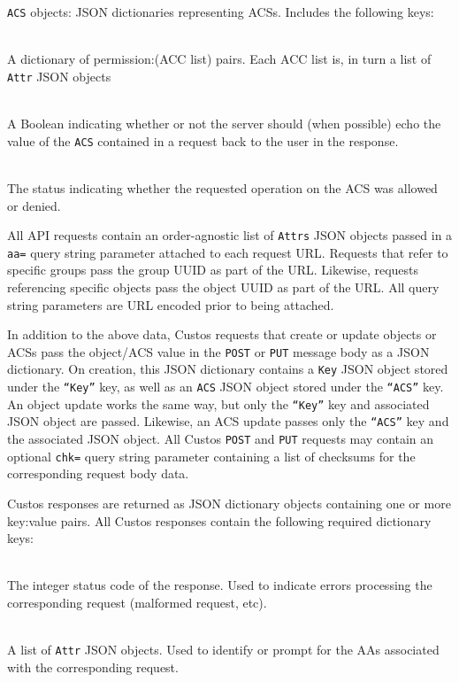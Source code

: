 \noindent
\texttt{ACS} objects: JSON dictionaries representing ACSs. Includes
the following keys:

\begin{packed_desc}
\item[\texttt{Permissions}] \hfill \\ A dictionary of permission:(ACC
  list) pairs. Each ACC list is, in turn a list of \texttt{Attr} JSON
  objects
\item[\texttt{Echo}] \hfill \\ A Boolean indicating whether or not the
  server should (when possible) echo the value of the \texttt{ACS}
  contained in a request back to the user in the response.
\item[\texttt{Status} (Response Only)] \hfill \\ The status indicating
  whether the requested operation on the ACS was allowed or denied.
\end{packed_desc}

All API requests contain an order-agnostic list of \texttt{Attrs} JSON
objects passed in a \texttt{aa=} query string parameter attached to
each request URL. Requests that refer to specific groups pass the
group UUID as part of the URL. Likewise, requests referencing specific
objects pass the object UUID as part of the URL. All query string
parameters are URL encoded prior to being attached.

In addition to the above data, Custos requests that create or update
objects or ACSs pass the object/ACS value in the \texttt{POST} or
\texttt{PUT} message body as a JSON dictionary. On creation, this JSON
dictionary contains a \texttt{Key} JSON object stored under the
\texttt{``Key''} key, as well as an \texttt{ACS} JSON object stored
under the \texttt{``ACS''} key. An object update works the same way,
but only the \texttt{``Key''} key and associated JSON object are
passed. Likewise, an ACS update passes only the \texttt{``ACS''} key
and the associated JSON object. All Custos \texttt{POST} and
\texttt{PUT} requests may contain an optional \texttt{chk=} query
string parameter containing a list of checksums for the corresponding
request body data.

Custos responses are returned as JSON dictionary objects containing
one or more key:value pairs. All Custos responses contain the
following required dictionary keys:

\begin{packed_desc}
\item[\texttt{Status}] \hfill \\ The integer status code of the
  response. Used to indicate errors processing the corresponding
  request (malformed request, etc).
\item[\texttt{Attrs}] \hfill \\ A list of \texttt{Attr} JSON
  objects. Used to identify or prompt for the AAs associated with the
  corresponding request.
\end{packed_desc}

